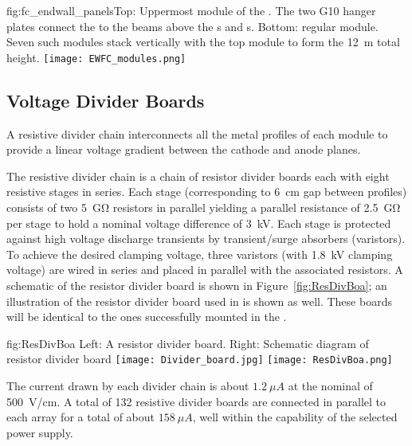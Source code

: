 \begin{dunefigure}{fig:fc_endwall_panels}{Top: Uppermost module of the . The two G10 hanger plates connect the  to the  beams above the s and s. Bottom: regular  module. Seven such modules stack vertically with the top module to form the \SI{12}{m} total height.}
\texttt{[image: EWFC\_modules.png]}
\end{dunefigure}



\subsection{Voltage Divider Boards}
\label{sec:fdsp-hv-des-fc-vdb}

A resistive divider chain interconnects all the metal profiles of each  module to provide a linear voltage gradient between the cathode and anode planes.

The resistive divider chain is %
 a chain of resistor divider boards each with %
eight resistive stages in series. 
 Each stage (corresponding to \SI{6}{cm} gap between  profiles) consists of two \SI{5}{\giga\ohm} resistors in parallel yielding a parallel resistance of \SI{2.5}{\giga\ohm} per stage to hold a nominal voltage difference of \SI{3}{kV}. Each stage is protected against high voltage discharge transients by transient/surge absorbers (varistors). To achieve the desired clamping voltage, three varistors (with \SI{1.8}{kV} clamping voltage) are wired in series and placed in parallel with the associated resistors. A schematic of the resistor divider board is shown in Figure~\ref{fig:ResDivBoa}; an illustration of the resistor divider board used in  is shown as well.
These boards will be identical to the ones successfully mounted in the  . 

\begin{dunefigure}{fig:ResDivBoa}
  {Left: A  resistor divider board. Right: Schematic diagram of resistor divider board}
  \texttt{[image: Divider\_board.jpg]}
  \texttt{[image: ResDivBoa.png]}
\end{dunefigure}


The current drawn by each divider chain is about $1.2~\mu A$ at the nominal \efield{} of \SI{500}{V/cm}. A total of 132 resistive divider 
boards are connected in parallel to each  array for a total of about $158~\mu A$, well within the capability of the selected  power supply.

